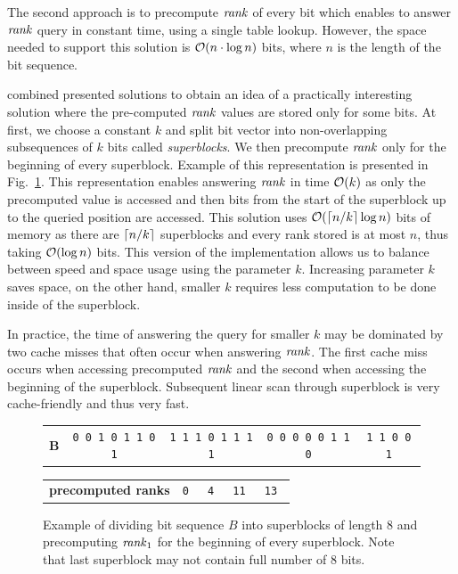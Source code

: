 The second approach is to precompute $\mathit{rank}$ of every bit which enables to answer
$\mathit{rank}$ query in constant time, using a single table lookup. However, the space needed to
support this solution is $\mathcal{O}(n\cdot\log n)$ bits, where $n$ is the length of the
bit sequence.

\cite{gonzalez2005practical} combined presented solutions to obtain an idea of a practically
interesting solution where the pre-computed $\mathit{rank}$ values are stored only for some
bits. At first, we choose a constant $k$ and split bit vector into non-overlapping
subsequences of $k$ bits called \textit{superblocks}. We then precompute $\mathit{rank}$ only for
the beginning of every superblock. Example of this representation is presented in
Fig.~\ref{obr:practicalRank}. This representation enables answering $\mathit{rank}$ in time
$\mathcal{O}(k)$ as only the precomputed value is accessed and then bits from the start of the
superblock up to the queried position are accessed. This solution uses $\mathcal{O}(\left\lceil n/k \right\rceil\log n)$
bits of memory as there are $\left\lceil n/k \right\rceil$ superblocks and every rank stored is at most $n$,
thus taking $\mathcal{O}(\log n)$ bits. This version of the implementation allows us to balance between
speed and space usage using the parameter $k$. Increasing parameter $k$ saves space, on the other
hand, smaller $k$ requires less computation to be done inside of the superblock.

In practice, the time of answering the query for smaller $k$ may be dominated by two cache misses
that often occur when answering $\mathit{rank}$. The first cache miss occurs when accessing precomputed
$\mathit{rank}$ and the second when accessing the beginning of the superblock. Subsequent linear scan
through superblock is very cache-friendly and thus very fast.


\begin{figure}
	\begin{tabular}{c|c|c|c|c|}
	\cline{2-5}
	\textbf{B} & {\tt 0 0 1 0 1 1 0 1} & {\tt 1 1 1 0 1 1 1 1} & {\tt 0 0 0 0 0 1 1 0} & {\tt 1 1 0 0 1} \\ \cline{2-5}
	\end{tabular}

    \bigskip

    \begin{tabular}{c|c|c|c|c|}
        \cline{2-5}
        \textbf{precomputed ranks} & \tt 0 & \tt 4 & \tt 11 & \tt 13 \\ \cline{2-5}
        \end{tabular}

	\caption[TODO]{Example of dividing bit sequence $B$ into superblocks of length 8 and precomputing
    $\mathit{rank}_1$ for the beginning of every superblock. Note that last superblock may not contain full
    number of 8 bits.}
	\label{obr:practicalRank}
\end{figure}

